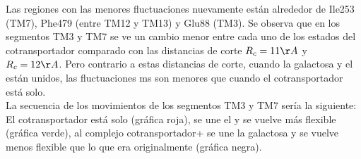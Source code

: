 Las regiones con las menores fluctuaciones nuevamente est\'{a}n alrededor de Ile253 (TM7), Phe479 (entre TM12 y TM13) y Glu88 (TM3). Se observa que en los segmentos TM3 y TM7 se ve un cambio menor entre cada uno de los estados del cotransportador comparado con las distancias de corte $R_c=11\AA$ y $R_c=12\AA$. Pero contrario a estas distancias de corte, cuando la galactosa y el  est\'{a}n unidos, las fluctuaciones ms son menores que cuando el cotransportador est\'{a} solo.\\
La secuencia de los movimientos de los segmentos TM3 y TM7 ser\'{i}a la siguiente: El cotransportador est\'{a} solo (gr\'{a}fica roja), se une el  y se vuelve m\'{a}s flexible (gr\'{a}fica verde), al complejo cotransportador+ se une la galactosa y se vuelve menos flexible que lo que era originalmente (gr\'{a}fica  negra).
